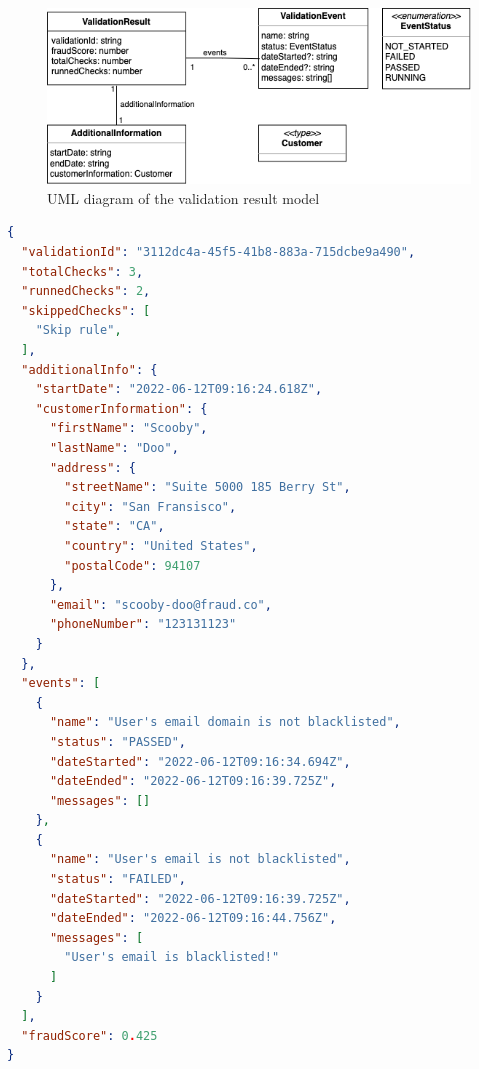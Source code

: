     \begin{figure}[!ht]
      \includegraphics[width=\textwidth]{diagrams/entity-validationresult.png}
      \caption{UML diagram of the validation result model}
      \label{fig:uml_validation_result}
    \end{figure}
    
    \begin{lstlisting}[caption={Validation result example (JSON)}, language=json]
{
  "validationId": "3112dc4a-45f5-41b8-883a-715dcbe9a490",
  "totalChecks": 3,
  "runnedChecks": 2,
  "skippedChecks": [
    "Skip rule",
  ],
  "additionalInfo": {
    "startDate": "2022-06-12T09:16:24.618Z",
    "customerInformation": {
      "firstName": "Scooby",
      "lastName": "Doo",
      "address": {
        "streetName": "Suite 5000 185 Berry St",
        "city": "San Fransisco",
        "state": "CA",
        "country": "United States",
        "postalCode": 94107
      },
      "email": "scooby-doo@fraud.co",
      "phoneNumber": "123131123"
    }
  },
  "events": [
    {
      "name": "User's email domain is not blacklisted",
      "status": "PASSED",
      "dateStarted": "2022-06-12T09:16:34.694Z",
      "dateEnded": "2022-06-12T09:16:39.725Z",
      "messages": []
    },
    {
      "name": "User's email is not blacklisted",
      "status": "FAILED",
      "dateStarted": "2022-06-12T09:16:39.725Z",
      "dateEnded": "2022-06-12T09:16:44.756Z",
      "messages": [
        "User's email is blacklisted!"
      ]
    }
  ],
  "fraudScore": 0.425  
}
    \end{lstlisting}